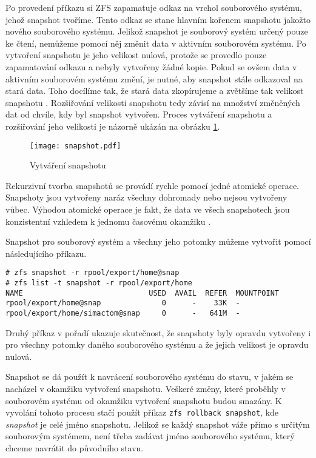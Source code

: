 Po provedení příkazu si ZFS zapamatuje odkaz na vrchol souborového systému, jehož snapshot tvoříme. Tento odkaz se stane hlavním kořenem snapshotu jakožto nového souborového systému. Jelikož snapshot je souborový systém určený pouze ke čtení, nemůžeme pomocí něj změnit data v aktivním souborovém systému. Po vytvoření snapshotu je jeho velikost nulová, protože se provedlo pouze zapamatování odkazu a nebyly vytvořeny žádné kopie. Pokud se ovšem data v aktivním souborovém systému změní, je nutné, aby snapshot stále odkazoval na stará data. Toho docílíme tak, že stará data zkopírujeme a zvětšíme tak velikost snapshotu \cite{snapshot}. Rozšiřování velikosti snapshotu tedy závisí na množství změněných dat od chvíle, kdy byl snapshot vytvořen. Proces vytváření snapshotu a rozšiřování jeho velikosti je názorně ukázán na obrázku \ref{snapshotproces}.
\begin{figure}[h]
    \caption{Vytváření snapshotu}
    \label{snapshotproces}
    \texttt{[image: snapshot.pdf]}
\end{figure}

Rekurzivní tvorba snapshotů se provádí rychle pomocí jedné atomické operace. Snapshoty jsou vytvořeny naráz všechny dohromady nebo nejsou vytvořeny vůbec. Výhodou atomické operace je fakt, že data ve všech snapshotech jsou konzistentní vzhledem k jednomu časovému okamžiku \cite{snapshot}.

Snapshot pro souborový systém a všechny jeho potomky můžeme vytvořit pomocí následujícího příkazu.
\begin{verbatim}
# zfs snapshot -r rpool/export/home@snap
# zfs list -t snapshot -r rpool/export/home
NAME                             USED  AVAIL  REFER  MOUNTPOINT
rpool/export/home@snap              0      -    33K  -
rpool/export/home/simactom@snap     0      -   641M  -
\end{verbatim}
Druhý příkaz v pořadí ukazuje skutečnost, že snapshoty byly opravdu vytvořeny i pro všechny potomky daného souborového systému a že jejich velikost je opravdu nulová.

Snapshot se dá použít k navrácení souborového systému do stavu, v jakém se nacházel v okamžiku vytvoření snapshotu. Veškeré změny, které proběhly v souborovém systému od okamžiku vytvoření snapshotu budou smazány. K vyvolání tohoto procesu stačí použít příkaz \verb|zfs rollback snapshot|, kde \emph{snapshot} je celé jméno snapshotu. Jelikož se každý snapshot váže přímo s určitým souborovým systémem, není třeba zadávat jméno souborového systému, který chceme navrátit do původního stavu. 